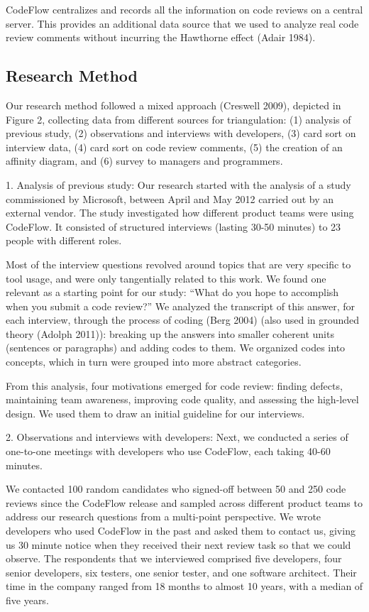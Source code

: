 \documentclass[conference]{IEEEtran}
\begin{document}
CodeFlow centralizes and records all the information on code reviews on a
central server. This provides an additional data source that we used to analyze
real code review comments without incurring the Hawthorne effect (Adair 1984).

\subsection{Research Method}

Our research method followed a mixed approach (Creswell 2009), depicted in
Figure 2, collecting data from different sources for triangulation: (1)
analysis of previous study, (2) observations and interviews with developers,
(3) card sort on interview data,  (4) card sort on code review comments, (5)
the creation of an affinity diagram, and (6) survey to managers and
programmers.

1. Analysis of previous study: Our research started with the analysis of a
study commissioned by Microsoft, between April and May 2012 carried out by an
external vendor. The study investigated how different product teams were using
CodeFlow. It consisted of structured interviews (lasting 30-50 minutes) to 23
people with different roles.

Most of the interview questions revolved around topics that are very specific
to tool usage, and were only tangentially related to this work. We found one
relevant as a starting point for our study: ``What do you hope to accomplish
when you submit a code review?'' We analyzed the transcript of this answer, for
each interview, through the process of coding (Berg 2004) (also used in
grounded theory (Adolph 2011)): breaking up the answers into smaller coherent
units (sentences or paragraphs) and adding codes to them. We organized codes
into concepts, which in turn were grouped into more abstract categories.

From this analysis, four motivations emerged for code review: finding defects,
maintaining team awareness, improving code quality, and assessing the
high-level design. We used them to draw an initial guideline for our
interviews.

2. Observations and interviews with developers: Next, we conducted a series of
one-to-one meetings with developers who use CodeFlow, each taking 40-60
minutes. 

We contacted 100 random candidates who signed-off between 50 and 250 code
reviews since the CodeFlow release and sampled across different product teams
to address our research questions from a multi-point perspective. We wrote
developers who used CodeFlow in the past and asked them to contact us, giving
us 30 minute notice when they received their next review task so that we could
observe.  The respondents that we interviewed comprised five developers, four
senior developers, six testers, one senior tester, and one software architect.
Their time in the company ranged from 18 months to almost 10 years, with a
median of five years. 
\end{document}
